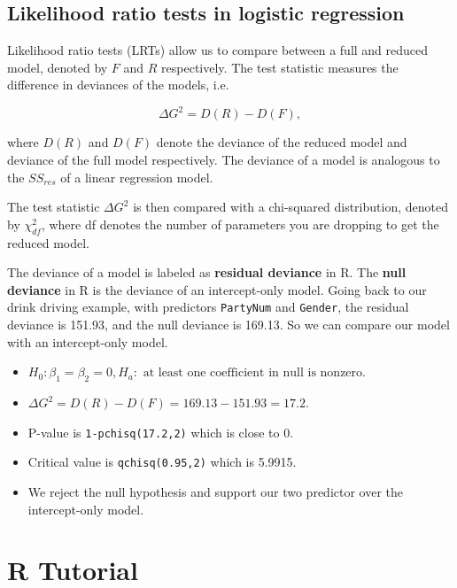 \documentclass[
]{book}
\providecommand{\tightlist}{%
  \setlength{\itemsep}{0pt}\setlength{\parskip}{0pt}}
\begin{document}
\hypertarget{likelihood-ratio-tests-in-logistic-regression}{%
\subsection{Likelihood ratio tests in logistic regression}\label{likelihood-ratio-tests-in-logistic-regression}}

Likelihood ratio tests (LRTs) allow us to compare between a full and reduced model, denoted by \(F\) and \(R\) respectively. The test statistic measures the difference in deviances of the models, i.e.

\begin{equation} 
\Delta G^2 = D(R) - D(F),
\label{eq:11LRT}
\end{equation}

where \(D(R)\) and \(D(F)\) denote the deviance of the reduced model and deviance of the full model respectively. The deviance of a model is analogous to the \(SS_{res}\) of a linear regression model.

The test statistic \(\Delta G^2\) is then compared with a chi-squared distribution, denoted by \(\chi^2_{df}\), where df denotes the number of parameters you are dropping to get the reduced model.

The deviance of a model is labeled as \textbf{residual deviance} in R. The \textbf{null deviance} in R is the deviance of an intercept-only model. Going back to our drink driving example, with predictors \texttt{PartyNum} and \texttt{Gender}, the residual deviance is 151.93, and the null deviance is 169.13. So we can compare our model with an intercept-only model.

\begin{itemize}
\tightlist
\item
  \(H_0: \beta_1 = \beta_2 = 0, H_a: \text{ at least one coefficient in null is nonzero.}\)
\item
  \(\Delta G^2 = D(R) - D(F) = 169.13 - 151.93 = 17.2\).
\item
  P-value is \texttt{1-pchisq(17.2,2)} which is close to 0.
\item
  Critical value is \texttt{qchisq(0.95,2)} which is 5.9915.
\item
  We reject the null hypothesis and support our two predictor over the intercept-only model.
\end{itemize}

\hypertarget{r-tutorial-8}{%
\section{R Tutorial}\label{r-tutorial-8}}
\end{document}

